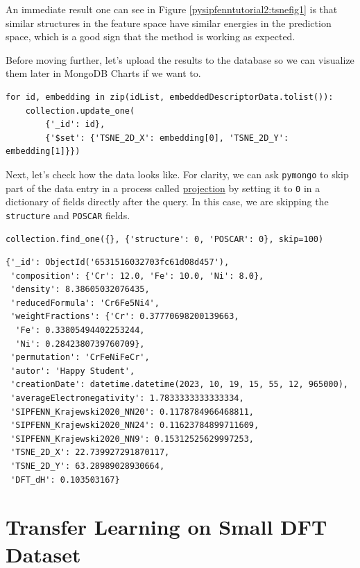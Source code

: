 An immediate result one can see in Figure \ref{pysipfenntutorial2:tsnefig1} is that similar structures in the feature space have similar energies in the prediction space, which is a
good sign that the method is working as expected.

Before moving further, let's upload the results to the database so we
can visualize them later in MongoDB Charts if we want to.

\begin{verbatim}
for id, embedding in zip(idList, embeddedDescriptorData.tolist()):
    collection.update_one(
        {'_id': id}, 
        {'$set': {'TSNE_2D_X': embedding[0], 'TSNE_2D_Y': embedding[1]}})
\end{verbatim}

Next, let's check how the data looks like. For clarity, we can ask
\texttt{pymongo} to skip part of the data entry in a
process called
\href{https://docs.mongodb.com/manual/tutorial/project-fields-from-query-results/}{projection}
by setting it to \texttt{0} in a dictionary of fields
directly after the query. In this case, we are skipping the
\texttt{structure} and \texttt{POSCAR}
fields.

\begin{verbatim}
collection.find_one({}, {'structure': 0, 'POSCAR': 0}, skip=100)
\end{verbatim}

\begin{verbatim}
{'_id': ObjectId('6531516032703fc61d08d457'),
 'composition': {'Cr': 12.0, 'Fe': 10.0, 'Ni': 8.0},
 'density': 8.38605032076435,
 'reducedFormula': 'Cr6Fe5Ni4',
 'weightFractions': {'Cr': 0.37770698200139663,
  'Fe': 0.33805494402253244,
  'Ni': 0.2842380739760709},
 'permutation': 'CrFeNiFeCr',
 'autor': 'Happy Student',
 'creationDate': datetime.datetime(2023, 10, 19, 15, 55, 12, 965000),
 'averageElectronegativity': 1.7833333333333334,
 'SIPFENN_Krajewski2020_NN20': 0.1178784966468811,
 'SIPFENN_Krajewski2020_NN24': 0.11623784899711609,
 'SIPFENN_Krajewski2020_NN9': 0.15312525629997253,
 'TSNE_2D_X': 22.739927291870117,
 'TSNE_2D_Y': 63.28989028930664,
 'DFT_dH': 0.103503167}
\end{verbatim}

\hypertarget{transfer-learning-on-small-dft-dataset}{%
\section{Transfer Learning on Small DFT
Dataset}\label{pysipfenntutorial2:transfer-learning-on-small-dft-dataset}}

